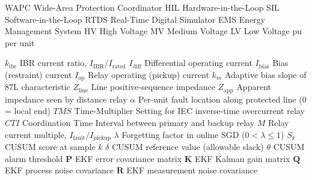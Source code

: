  {WAPC} {Wide-Area Protection Coordinator}
  {HIL}  {Hardware-in-the-Loop}
  {SIL}  {Software-in-the-Loop}
 {RTDS} {Real-Time Digital Simulator}
  {EMS}  {Energy Management System}
   {HV}   {High Voltage}
   {MV}   {Medium Voltage}
   {LV}   {Low Voltage}
   {pu}   {per unit}

    {$k_\mathrm{ibr}$}
  {IBR current ratio, $I_\mathrm{IBR}/I_\mathrm{rated}$}
   {$I_\mathrm{diff}$}
  {Differential operating current}
   {$I_\mathrm{bias}$}
  {Bias (restraint) current}
     {$I_\mathrm{op}$}
  {Relay operating (pickup) current}
      {$k_m$}
  {Adaptive bias slope of 87L characteristic}
   {$Z_\mathrm{line}$}
  {Line positive-sequence impedance}
    {$Z_\mathrm{app}$}
  {Apparent impedance seen by distance relay}
   {$\alpha$}
  {Per-unit fault location along protected line (0 = local end)}
     {$\mathit{TMS}$}
  {Time-Multiplier Setting for IEC inverse-time overcurrent relay}
     {$\mathit{CTI}$}
  {Coordination Time Interval between primary and backup relay}
       {$M$}
  {Relay current multiple, $I_\mathrm{fault}/I_\mathrm{pickup}$}
  {$\lambda$}
  {Forgetting factor in online SGD ($0 < \lambda \leq 1$)}
       {$S_k$}
  {CUSUM score at sample $k$}
   {$\delta$}
  {CUSUM reference value (allowable slack)}
   {$\theta$}
  {CUSUM alarm threshold}
       {$\mathbf{P}$}
  {EKF error covariance matrix}
       {$\mathbf{K}$}
  {EKF Kalman gain matrix}
       {$\mathbf{Q}$}
  {EKF process noise covariance}
       {$\mathbf{R}$}
  {EKF measurement noise covariance}

